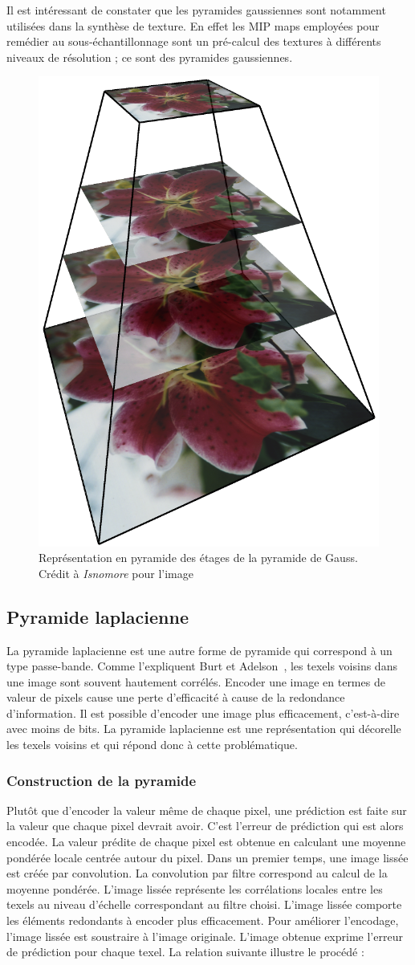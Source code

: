 \noindent Il est intéressant de constater que les pyramides gaussiennes sont notamment utilisées dans la synthèse de texture. En effet les MIP maps employées pour remédier au sous-échantillonnage sont un pré-calcul des textures à différents niveaux de résolution ; ce sont des pyramides gaussiennes.

\begin{figure}
    \centering
    \includegraphics[width=.25\textwidth]{contenu/resources/images/image_pyramid_placeholder}
    \caption[Représentation pyramidale des étages de la pyramide de Gauss]{Représentation en pyramide des étages de la pyramide de Gauss. Crédit à \textit{Isnomore} pour l'image}
    \label{fig:pyramid-gauss}
\end{figure}

\subsection{Pyramide laplacienne}

La pyramide laplacienne est une autre forme de pyramide qui correspond à un type passe-bande. Comme l'expliquent Burt et Adelson~\cite{burt_laplacian_1983}, les texels voisins dans une image sont souvent hautement corrélés. Encoder une image en termes de valeur de pixels cause une perte d'efficacité à cause de la redondance d'information. Il est possible d'encoder une image plus efficacement, c'est-à-dire avec moins de bits. La pyramide laplacienne est une représentation qui décorelle les texels voisins et qui répond donc à cette problématique.

\subsubsection{Construction de la pyramide}

Plutôt que d'encoder la valeur même de chaque pixel, une prédiction est faite sur la valeur que chaque pixel devrait avoir. C'est l'erreur de prédiction qui est alors encodée. La valeur prédite de chaque pixel est obtenue en calculant une moyenne pondérée locale centrée autour du pixel. Dans un premier temps, une image lissée est créée par convolution. La convolution par filtre correspond au calcul de la moyenne pondérée. L'image lissée représente les corrélations locales entre les texels au niveau d'échelle correspondant au filtre choisi. L'image lissée comporte les éléments redondants à encoder plus efficacement. Pour améliorer l'encodage, l'image lissée est soustraire à l'image originale. L'image obtenue exprime l'erreur de prédiction pour chaque texel. La relation suivante illustre le procédé :

